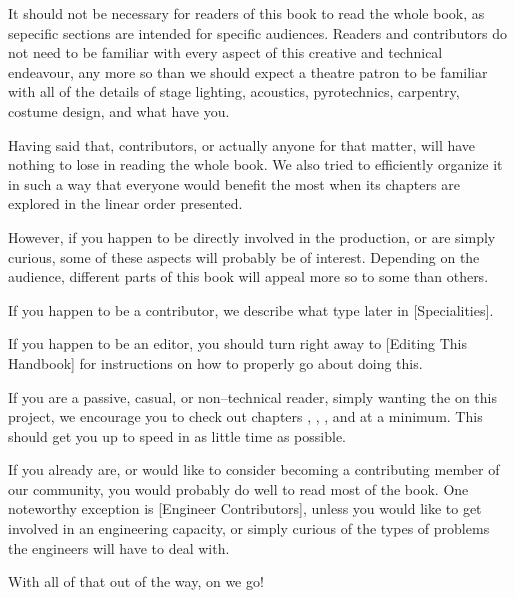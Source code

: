 

It should not be necessary for readers of this book to read the whole book, as sepecific sections are intended for specific audiences. Readers and contributors do not need to be familiar with every aspect of this creative and technical endeavour, any more so than we should expect a theatre patron to be familiar with all of the details of stage lighting, acoustics, pyrotechnics, carpentry, costume design, and what have you.

Having said that, contributors, or actually anyone for that matter, will have nothing to lose in reading the whole book. We also tried to efficiently organize it in such a way that everyone would benefit the most when its chapters are explored in the linear order presented.

However, if you happen to be directly involved in the production, or are simply curious, some of these aspects will probably be of interest. Depending on the audience, different parts of this book will appeal more so to some than others.

If you happen to be a contributor, we describe what type later in [Specialities].

If you happen to be an editor, you should turn right away to [Editing This Handbook] for instructions on how to properly go about doing this.

If you are a passive, casual, or non--technical reader, simply wanting the  on this project, we encourage you to check out chapters \in[Leitmotifs], , , and \in[Timeline] at a minimum. This should get you up to speed in as little time as possible.

If you already are, or would like to consider becoming a contributing member of our community, you would probably do well to read most of the book. One noteworthy exception is [Engineer Contributors], unless you would like to get involved in an engineering capacity, or simply curious of the types of problems the engineers will have to deal with.

With all of that out of the way, on we go!

\StopChapter

